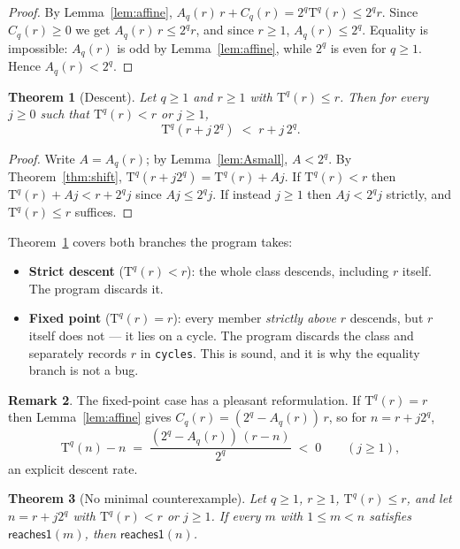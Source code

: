 \documentclass[11pt,a4paper]{article}
\theoremstyle{plain}
\newtheorem{theorem}{Theorem}[section]
\theoremstyle{definition}
\newtheorem{remark}[theorem]{Remark}
\newcommand{\Tmap}{\mathrm{T}}
\newcommand{\Acoef}{A}
\newcommand{\Ccoef}{C}
\newcommand{\reaches}{\mathsf{reaches1}}
\begin{document}
\begin{proof}
By Lemma~\ref{lem:affine},
$\Acoef_{q}(r)\,r + \Ccoef_{q}(r) = 2^{q}\Tmap^{q}(r) \leq 2^{q}r$.
Since $\Ccoef_{q}(r) \geq 0$ we get $\Acoef_{q}(r)\,r \leq 2^{q}r$, and since
$r \geq 1$, $\Acoef_{q}(r) \leq 2^{q}$. Equality is impossible:
$\Acoef_{q}(r)$ is odd by Lemma~\ref{lem:affine}, while $2^{q}$ is even for
$q \geq 1$. Hence $\Acoef_{q}(r) < 2^{q}$.
\end{proof}

\begin{theorem}[Descent]\label{thm:descent}
Let $q \geq 1$ and $r \geq 1$ with $\Tmap^{q}(r) \leq r$. Then for every
$j \geq 0$ such that $\Tmap^{q}(r) < r$ or $j \geq 1$,
\[
  \Tmap^{q}\!\left(r + j\,2^{q}\right) \;<\; r + j\,2^{q}.
\]
\end{theorem}

\begin{proof}
Write $A = \Acoef_{q}(r)$; by Lemma~\ref{lem:Asmall}, $A < 2^{q}$. By
Theorem~\ref{thm:shift}, $\Tmap^{q}(r + j2^{q}) = \Tmap^{q}(r) + Aj$.
If $\Tmap^{q}(r) < r$ then $\Tmap^{q}(r) + Aj < r + 2^{q}j$ since
$Aj \leq 2^{q}j$. If instead $j \geq 1$ then $Aj < 2^{q}j$ strictly, and
$\Tmap^{q}(r) \leq r$ suffices.
\end{proof}

Theorem~\ref{thm:descent} covers both branches the program takes:

\begin{itemize}\itemsep3pt
\item \textbf{Strict descent} ($\Tmap^{q}(r) < r$): the whole class descends,
      including $r$ itself. The program discards it.
\item \textbf{Fixed point} ($\Tmap^{q}(r) = r$): every member \emph{strictly
      above} $r$ descends, but $r$ itself does not --- it lies on a cycle. The
      program discards the class and separately records $r$ in
      \texttt{cycles}. This is sound, and it is why the equality branch is not
      a bug.
\end{itemize}

\begin{remark}
The fixed-point case has a pleasant reformulation. If $\Tmap^{q}(r) = r$ then
Lemma~\ref{lem:affine} gives $\Ccoef_{q}(r) = (2^{q} - \Acoef_{q}(r))\,r$, so
for $n = r + j2^{q}$,
\[
  \Tmap^{q}(n) - n \;=\; \frac{(2^{q} - \Acoef_{q}(r))\,(r - n)}{2^{q}} \;<\; 0
  \qquad (j \geq 1),
\]
an explicit descent rate.
\end{remark}

\begin{theorem}[No minimal counterexample]\label{thm:nomin}
Let $q \geq 1$, $r \geq 1$, $\Tmap^{q}(r) \leq r$, and let
$n = r + j2^{q}$ with $\Tmap^{q}(r) < r$ or $j \geq 1$. If every $m$ with
$1 \leq m < n$ satisfies $\reaches(m)$, then $\reaches(n)$.
\end{theorem}
\end{document}
